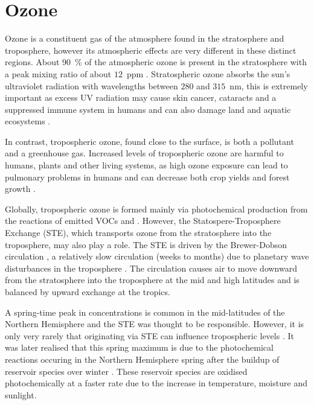 \section{Ozone} \label{s:ozone}
Ozone is a constituent gas of the atmosphere found in the stratosphere and troposphere, however its atmospheric effects are very different in these distinct regions.
About 90~\% of the atmospheric ozone is present in the stratosphere with a peak mixing ratio of about $12$~ppm \citep{Seinfeld:2006}.
Stratospheric ozone absorbs the sun's ultraviolet radiation with wavelengths between $280$ and $315$~nm, this is extremely important as excess UV radiation may cause skin cancer, cataracts and a suppressed immune system in humans and can also damage land and aquatic ecosystems \citep{WMO:2010}. 

In contrast, tropospheric ozone, found close to the surface, is both a pollutant and a greenhouse gas. 
Increased levels of tropospheric ozone are harmful to humans, plants and other living systems, as high ozone exposure can lead to pulmonary problems in humans and can decrease both crop yields and forest growth \citep{WMO:2010}. 

Globally, tropospheric ozone is formed mainly via photochemical production from the reactions of emitted VOCs and .
However, the Statospere-Troposphere Exchange (STE), which transports ozone from the stratosphere into the troposphere, may also play a role. 
The STE is driven by the Brewer-Dobson circulation \citep{Brewer:1949, Dobson:1956}, a relatively slow circulation (weeks to months) due to planetary wave disturbances in the troposphere \citep{Haynes:1991}.
The circulation causes air to move downward from the stratosphere into the troposphere at the mid and high latitudes and is balanced by upward exchange at the tropics. 

A spring-time peak in  concentrations is common in the mid-latitudes of the Northern Hemisphere and the STE was thought to be responsible. 
However, it is only very rarely that  originating via STE can influence tropospheric  levels \citep{Lelieveld:2000}. 
It was later realised that this spring maximum is due to the photochemical reactions occuring in the Northern Hemisphere spring after the buildup of reservoir species over winter \citep{Penkett:1986}.
These reservoir species are oxidised photochemically at a faster rate due to the increase in temperature, moisture and sunlight.

